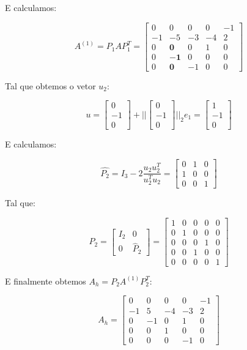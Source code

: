 \documentclass[11pt]{report}
\begin{document}
E calculamos:

\[
A^{(1)} = P_1AP_1^T = \begin{bmatrix}
0& 0 & 0 & 0& -1\\
-1& -5 & -3 & -4& 2\\
0& \mathbf{0} & 0 & 1& 0\\
0& \mathbf{-1} & 0 & 0& 0\\
0& \mathbf{0} & -1 & 0& 0
\end{bmatrix}
\]

Tal que obtemos o vetor $u_2$:

\[
u = \begin{bmatrix}
0 \\ -1 \\ 0
\end{bmatrix}
+  ||\begin{bmatrix}
0 \\ -1 \\ 0
\end{bmatrix}||_2 e_1 = \begin{bmatrix}
1 \\ -1 \\ 0
\end{bmatrix}
\]

E calculamos:

\[
\hat{P_2} = I_3 - 2\frac{u_2u_2^T}{u_2^Tu_2} = \begin{bmatrix}
0 & 1 & 0 \\
1 & 0 & 0\\
0 & 0 & 1
\end{bmatrix}
\]

Tal que:

\[
P_2 = \begin{bmatrix}
I_2 & 0 \\
0   & \hat{P}_2
\end{bmatrix}
=
\begin{bmatrix}
1& 0 & 0 & 0& 0\\
0& 1 & 0 & 0& 0\\
0& 0 & 0 & 1& 0\\
0& 0 & 1 & 0& 0\\
0& 0 & 0 & 0& 1
\end{bmatrix}
\]

E finalmente obtemos $A_h = P_2 A^{(1)} P_2^T$:

\[
A_h = \begin{bmatrix}
0& 0 & 0 & 0& -1\\
-1& 5 & -4 & -3& 2\\
0& -1 & 0 & 1& 0\\
0& 0 & 1 & 0& 0\\
0& 0 & 0 & -1& 0
\end{bmatrix}
\]
\end{document}
